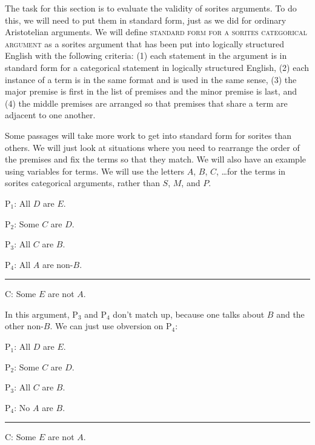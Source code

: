 The task for this section is to evaluate the validity of sorites arguments. To do this, we will need to put them in standard form, just as we did for ordinary Aristotelian arguments. We will define \textsc{\gls{standard form for a sorites categorical argument}} \label{def:standard_form_for_a_sorites_categorical_argument} as a sorites argument that has been put into logically structured English with the following criteria: (1) each statement in the argument is in standard form for a categorical statement in logically structured English, (2) each instance of a term is in the same format and is used in the same sense, (3) the major premise is first in the list of premises and the minor premise is last, and (4) the middle premises are arranged so that premises that share a term are adjacent to one another.

Some passages will take more work to get into standard form for sorites than others. We will just look at situations where you need to rearrange the order of the premises and fix the terms so that they match. We will also have an example using variables for terms. We will use the letters $A$, $B$, $C$, \ldots for the terms in sorites categorical arguments, rather than $S$, $M$, and $P$. 

\begin{earg}
\item[P$_1$:] All $D$ are $E$.
\item[P$_2$:] Some $C$ are $D$.
\item[P$_3$:] All $C$ are $B$.  
\item[P$_4$:] All $A$ are non-$B$.
\vspace{-.5em}
\item [] \rule{0.2\linewidth}{.5pt} 
\item[C:] Some $E$ are not $A$.    
\end{earg} 

In this argument, P$_3$ and P$_4$ don't match up, because one talks about $B$ and the other non-$B$. We can just use obversion on P$_4$:  

\begin{earg}
\item[P$_1$:] All $D$ are $E$.
\item[P$_2$:] Some $C$ are $D$.
\item[P$_3$:] All $C$ are $B$.  
\item[P$_4$:] No $A$ are $B$.
\vspace{-.5em}
\item [] \rule{0.2\linewidth}{.5pt} 
\item[C:] Some $E$ are not $A$.    
\end{earg} 

